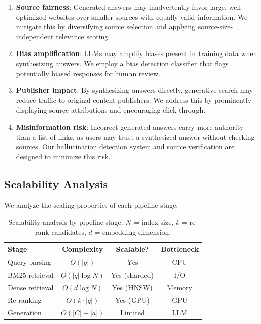 \begin{enumerate}[leftmargin=1.4em]
    \item \textbf{Source fairness}: Generated answers may inadvertently favor large, well-optimized websites over smaller sources with equally valid information. We mitigate this by diversifying source selection and applying source-size-independent relevance scoring.
    \item \textbf{Bias amplification}: LLMs may amplify biases present in training data when synthesizing answers. We employ a bias detection classifier that flags potentially biased responses for human review.
    \item \textbf{Publisher impact}: By synthesizing answers directly, generative search may reduce traffic to original content publishers. We address this by prominently displaying source attributions and encouraging click-through.
    \item \textbf{Misinformation risk}: Incorrect generated answers carry more authority than a list of links, as users may trust a synthesized answer without checking sources. Our hallucination detection system and source verification are designed to minimize this risk.
\end{enumerate}

\subsection{Scalability Analysis}

We analyze the scaling properties of each pipeline stage:

\begin{table}[H]
\centering
\small
\begin{tabular}{lccc}
\toprule
\textbf{Stage} & \textbf{Complexity} & \textbf{Scalable?} & \textbf{Bottleneck} \\
\midrule
Query parsing & $O(|q|)$ & Yes & CPU \\
BM25 retrieval & $O(|q| \log N)$ & Yes (sharded) & I/O \\
Dense retrieval & $O(d \log N)$ & Yes (HNSW) & Memory \\
Re-ranking & $O(k \cdot |q|)$ & Yes (GPU) & GPU \\
Generation & $O(|C| + |a|)$ & Limited & LLM \\
\bottomrule
\end{tabular}
\caption{Scalability analysis by pipeline stage. $N$ = index size, $k$ = re-rank candidates, $d$ = embedding dimension.}
\label{tab:scalability}
\end{table}

